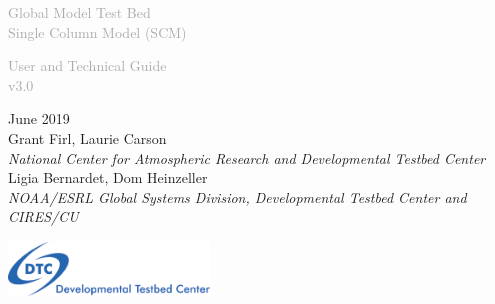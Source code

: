 \begin{titlepage}
\renewcommand{\thefootnote}{\fnsymbol{footnote}}

\vspace*{1em}
\noindent

\begin{center}
\textcolor{darkgray}{\bigsf Global Model Test Bed\\[0.5ex] Single Column Model (SCM)}
\vspace*{1em}\par

\textcolor{darkgray}{\bigst User and Technical Guide\\[0.5ex] v3.0}
\vspace*{1em}\par

\large{June 2019}\\

Grant Firl, Laurie Carson\\
\textit{\small{National Center for Atmospheric Research and Developmental Testbed Center}}\\[4em]

Ligia Bernardet, Dom Heinzeller\\
\textit{\small{NOAA/ESRL Global Systems Division, Developmental Testbed Center and CIRES/CU}}\\[4em]

\vspace{4em}

\includegraphics[width=0.4\textwidth]{images/dtc_logo.png}\\[2em]

\end{center}
\end{titlepage}
\pagebreak{}
